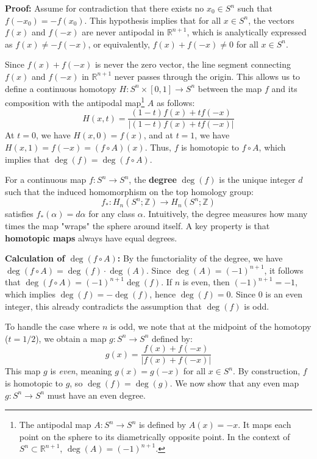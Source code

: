 \begin{solution}
\textbf{Proof:} Assume for contradiction that there exists no $x_0 \in S^n$ such that $f(-x_0) = -f(x_0)$. This hypothesis implies that for all $x \in S^n$, the vectors $f(x)$ and $f(-x)$ are never antipodal in $\mathbb{R}^{n+1}$, which is analytically expressed as $f(x) \neq -f(-x)$, or equivalently, $f(x) + f(-x) \neq 0$ for all $x \in S^n$.

Since $f(x) + f(-x)$ is never the zero vector, the line segment connecting $f(x)$ and $f(-x)$ in $\mathbb{R}^{n+1}$ never passes through the origin. This allows us to define a continuous homotopy $H: S^n \times [0, 1] \to S^n$ between the map $f$ and its composition with the antipodal map\footnote{The antipodal map $A: S^n \to S^n$ is defined by $A(x) = -x$. It maps each point on the sphere to its diametrically opposite point. In the context of $S^n \subset \mathbb{R}^{n+1}$, $\deg(A) = (-1)^{n+1}$.} $A$ as follows:
\[ H(x, t) = \frac{(1-t)f(x) + t f(-x)}{|(1-t)f(x) + t f(-x)|} \]
At $t=0$, we have $H(x, 0) = f(x)$, and at $t=1$, we have $H(x, 1) = f(-x) = (f \circ A)(x)$. Thus, $f$ is homotopic to $f \circ A$, which implies that $\deg(f) = \deg(f \circ A)$.

\begin{definition}
For a continuous map $f: S^n \to S^n$, the \textbf{degree} $\deg(f)$ is the unique integer $d$ such that the induced homomorphism on the top homology group:
\[ f_*: H_n(S^n; \mathbb{Z}) \to H_n(S^n; \mathbb{Z}) \]
satisfies $f_*(\alpha) = d\alpha$ for any class $\alpha$. Intuitively, the degree measures how many times the map "wraps" the sphere around itself. A key property is that \textbf{homotopic maps} always have equal degrees.
\end{definition}

\textbf{Calculation of $\deg(f \circ A)$:}
By the functoriality of the degree, we have $\deg(f \circ A) = \deg(f) \cdot \deg(A)$. Since $\deg(A) = (-1)^{n+1}$, it follows that $\deg(f \circ A) = (-1)^{n+1} \deg(f)$.
If $n$ is even, then $(-1)^{n+1} = -1$, which implies $\deg(f) = -\deg(f)$, hence $\deg(f) = 0$. Since $0$ is an even integer, this already contradicts the assumption that $\deg(f)$ is odd.

To handle the case where $n$ is odd, we note that at the midpoint of the homotopy ($t = 1/2$), we obtain a map $g: S^n \to S^n$ defined by:
\[ g(x) = \frac{f(x) + f(-x)}{|f(x) + f(-x)|} \]
This map $g$ is \textit{even}, meaning $g(x) = g(-x)$ for all $x \in S^n$. By construction, $f$ is homotopic to $g$, so $\deg(f) = \deg(g)$. We now show that any even map $g: S^n \to S^n$ must have an even degree.


\end{solution}
